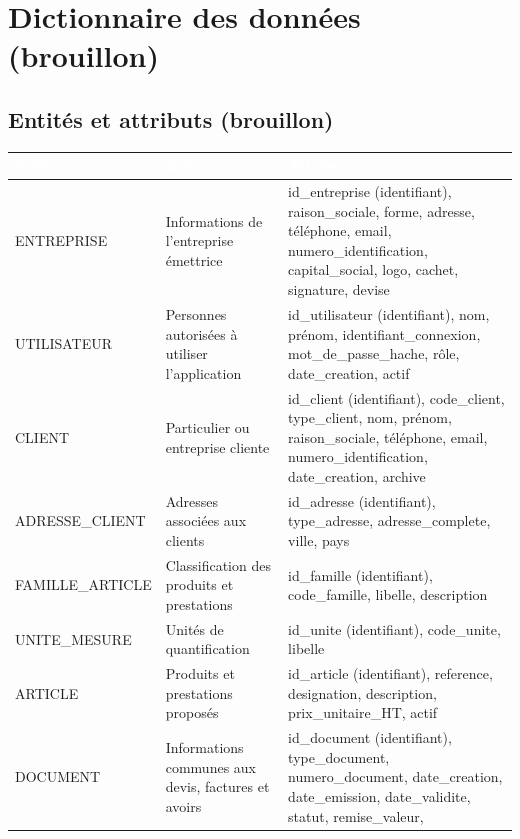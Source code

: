 \documentclass[11pt,a4paper]{article}
\newcommand{\entete}[1]{\textcolor{white}{\textbf{#1}}}
\begin{document}
\section{Dictionnaire des données (brouillon)}

\subsection{Entités et attributs (brouillon)}

{\small
\begin{longtable}{|L{3.2cm}|L{4.2cm}|L{7.8cm}|}
\hline
{}
\entete{Entité} & \entete{Rôle} & \entete{Attributs} \\
\hline
\endhead
ENTREPRISE & Informations de l'entreprise émettrice &
  id\_entreprise (identifiant), raison\_sociale, forme, adresse, téléphone,
  email, numero\_identification, capital\_social, logo, cachet, signature,
  devise \\ \hline
UTILISATEUR & Personnes autorisées à utiliser l'application &
  id\_utilisateur (identifiant), nom, prénom, identifiant\_connexion,
  mot\_de\_passe\_hache, rôle, date\_creation, actif \\ \hline
CLIENT & Particulier ou entreprise cliente &
  id\_client (identifiant), code\_client, type\_client, nom, prénom,
  raison\_sociale, téléphone, email, numero\_identification, date\_creation,
  archive \\ \hline
ADRESSE\_CLIENT & Adresses associées aux clients &
  id\_adresse (identifiant), type\_adresse, adresse\_complete, ville,
  pays \\ \hline
FAMILLE\_ARTICLE & Classification des produits et prestations &
  id\_famille (identifiant), code\_famille, libelle, description \\ \hline
UNITE\_MESURE & Unités de quantification &
  id\_unite (identifiant), code\_unite, libelle \\ \hline
ARTICLE & Produits et prestations proposés &
  id\_article (identifiant), reference, designation, description,
  prix\_unitaire\_HT, actif \\ \hline
DOCUMENT & Informations communes aux devis, factures et avoirs &
  id\_document (identifiant), type\_document, numero\_document,
  date\_creation, date\_emission, date\_validite, statut, remise\_valeur,

\end{longtable}}
\end{document}
